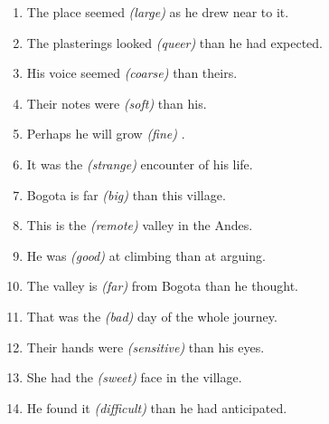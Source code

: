 \documentclass{fiche}
\begin{document}
\entete





\begin{anglais}
\begin{enumerate}[label=\arabic*.,itemsep=2.2mm,leftmargin=*]
  \item The place seemed \emph{(large)}  as he drew near to it.
  \item The plasterings looked \emph{(queer)}  than he had expected.
  \item His voice seemed \emph{(coarse)}  than theirs.
  \item Their notes were \emph{(soft)}  than his.
  \item Perhaps he will grow \emph{(fine)} .
  \item It was the \emph{(strange)}  encounter of his life.
  \item Bogota is far \emph{(big)}  than this village.
  \item This is the \emph{(remote)}  valley in the
    Andes.
  \item He was \emph{(good)}  at climbing than at arguing.
  \item The valley is \emph{(far)}  from Bogota than he
    thought.
  \item That was the \emph{(bad)}  day of the whole journey.
  \item Their hands were \emph{(sensitive)}  than his eyes.
  \item She had the \emph{(sweet)}  face in the village.
  \item He found it \emph{(difficult)}  than he had anticipated.
\end{enumerate}
\end{anglais}
\end{document}
